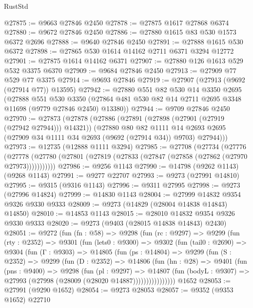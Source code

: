 \begin{lexlean}{RustStd}
\begin{coremodule}
{\begin{coremodule}
{{{{{{{{{{{{{{{{{{{{{{{{{{{{{{{{{{{{{{{{{{{{{{{{{{{{{{{@27875 := @9663 @27846 @2450
@27878 := @27875 @1617 @27868 @6374
@27880 := @9672 @27846 @2450
@27886 := @27880 @1615 @83 @530 @1573 @6372 @2696
@27888 := @9640 @27846 @2450
@27891 := @27888 @1615 @530 @6372
@27898 := @27865 @530 @1614 @14162 @2711 @6371 @3294 @12772
@27901 := @27875 @1614 @14162 @6371
@27907 := @27880 @126 @1613 @529 @532 @3375 @6370
@27909 := @9684 @27846 @2450
@27913 := @27909 @77 @529 @77 @3375
@27914 := @9693 @27846
@27919 := @27907 (@27913 (@9692 (@27914 @77)) @13595)
@27942 := @27880
    @551
    @82
    @530
    @14
    @3350
    @2695
    (@27888
      @551
      @530
      @3350
      (@27864 @481 @530 @82 @14 @2711 @2695 @3348 @11698 (@9779 @27846 @2450) @13380))
@27944 := @9709 @27846 @2450
@27970 := @27873
    (@27878
      (@27886
        (@27891 (@27898 (@27901 (@27919 (@27942 @27944))) @14321))
        (@27880
          @80
          @82
          @1111
          @14
          @2693
          @2695
          (@27909 @34 @1111 @34 @2693 (@9692 (@27914 @34)) @9703)
          @27944)))
@27973 := @12735 (@12888 @1111 @3294)
@27985 := @27708
    (@27734
      (@27776
        (@27778 (@27780 (@27801 (@27819 (@27833 (@27847 (@27858 (@27862 (@27970 @27973)))))))))))
@27986 := @9256 @1143
@27990 := @14798 (@9262 @1143) (@9268 @1143)
@27991 := @9277 @22707
@27993 := @9273 (@27991 @14810)
@27995 := @9315 (@9316 @1143)
@27996 := @9311 @27995
@27998 := @9273 (@27996 @14824)
@27999 := @14830 @1143
@28004 := @27999 @14832 @9354 @9326 @9330 @9333
@28009 := @9273 (@14829 (@28004 @14838 @14843) @14850)
@28010 := @14853 @1143
@28015 := @28010 @14832 @9354 @9326 @9330 @9333
@28020 := @9273 (@9403 (@28015 @14838 @14843) @2430)
@28051 := @9272
    (fun (fn : @58) =>
    @9298
      (fun (rc : @9297) =>
      @9299
        (fun (rty : @2352) =>
        @9301
          (fun (lets0 : @9300) =>
          @9302
            (fun (tail0 : @2690) =>
            @9304
              (fun (Γ : @9303) =>
              @14805
                (fun (ps : @14804) =>
                @9299
                  (fun (S : @2352) =>
                  @9299
                    (fun (D : @2352) =>
                    @14806
                      (fun (hn : @28) =>
                      @9401
                        (fun (pns : @9400) =>
                        @9298
                          (fun (pl : @9297) =>
                          @14807
                            (fun (bodyL : @9307) =>
                            @27993 (@27998 (@28009 (@28020 @14887))))))))))))))))
    @1652
@28053 := @27991 (@9290 @1652)
@28054 := @9273 @28053
@28057 := @9352 (@9353 @1652) @22710
}}}}}}}}}}}}}}}}}}}}}}}}}}}}}}}}}}}}}}}}}}}}}}}}}}}}}}}
\end{coremodule}}
\end{coremodule}
\end{lexlean}
